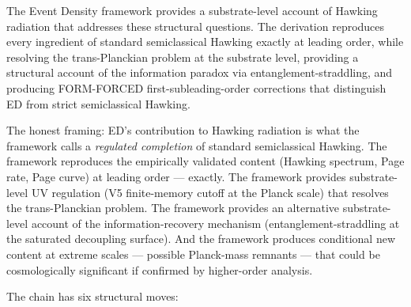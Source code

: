 \documentclass[11pt,a4paper]{article}
\begin{document}
The Event Density framework provides a substrate-level account of Hawking radiation that addresses these structural questions. The derivation reproduces every ingredient of standard semiclassical Hawking exactly at leading order, while resolving the trans-Planckian problem at the substrate level, providing a structural account of the information paradox via entanglement-straddling, and producing FORM-FORCED first-subleading-order corrections that distinguish ED from strict semiclassical Hawking.

The honest framing: ED's contribution to Hawking radiation is what the framework calls a \emph{regulated completion} of standard semiclassical Hawking. The framework reproduces the empirically validated content (Hawking spectrum, Page rate, Page curve) at leading order --- exactly. The framework provides substrate-level UV regulation (V5 finite-memory cutoff at the Planck scale) that resolves the trans-Planckian problem. The framework provides an alternative substrate-level account of the information-recovery mechanism (entanglement-straddling at the saturated decoupling surface). And the framework produces conditional new content at extreme scales --- possible Planck-mass remnants --- that could be cosmologically significant if confirmed by higher-order analysis.

The chain has six structural moves:
\end{document}
